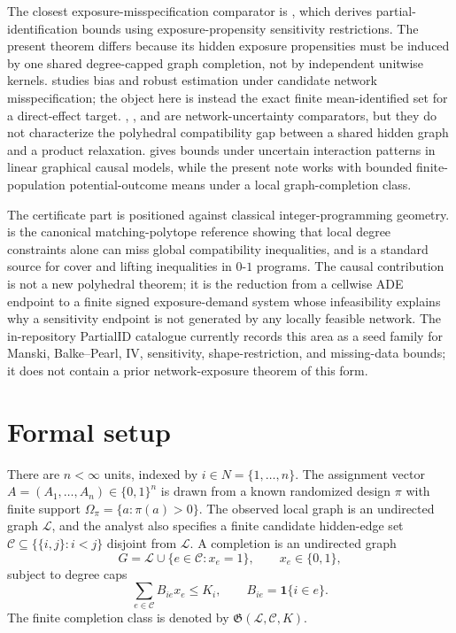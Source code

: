 \documentclass[11pt]{article}
\newcommand{\one}{\mathbf{1}}
\theoremstyle{definition}
\theoremstyle{plain}
\theoremstyle{remark}
\begin{document}
The closest exposure-misspecification comparator is
\cite{SchroderOprescuFeuerriegelKallus2026}, which derives partial-identification
bounds using exposure-propensity sensitivity restrictions.  The present theorem
differs because its hidden exposure propensities must be induced by one shared
degree-capped graph completion, not by independent unitwise kernels.
\cite{WeinsteinNevo2026} studies bias and robust estimation under candidate
network misspecification; the object here is instead the exact finite
mean-identified set for a direct-effect target.  \cite{Egami2020},
\cite{BhattacharyaMalinskyShpitser2020}, and \cite{LiSussmanKolaczyk2021} are
network-uncertainty comparators, but they do not characterize the polyhedral
compatibility gap between a shared hidden graph and a product relaxation.
\cite{ZhangMohanPearl2023} gives bounds under uncertain interaction patterns in
linear graphical causal models, while the present note works with bounded
finite-population potential-outcome means under a local graph-completion class.

The certificate part is positioned against classical integer-programming
geometry.  \cite{Edmonds1965} is the canonical matching-polytope reference
showing that local degree constraints alone can miss global compatibility
inequalities, and \cite{Wolsey1975} is a standard source for cover and lifting
inequalities in \(0\)-\(1\) programs.  The causal contribution is not a new
polyhedral theorem; it is the reduction from a cellwise ADE endpoint to a
finite signed exposure-demand system whose infeasibility explains why a
sensitivity endpoint is not generated by any locally feasible network.  The
in-repository PartialID catalogue currently records this area as a seed family
for Manski, Balke--Pearl, IV, sensitivity, shape-restriction, and missing-data
bounds; it does not contain a prior network-exposure theorem of this form.

\section{Formal setup}
There are \(n<\infty\) units, indexed by \(i\in N=\{1,\ldots,n\}\).  The
assignment vector \(A=(A_1,\ldots,A_n)\in\{0,1\}^n\) is drawn from a known
randomized design \(\pi\) with finite support
\(\Omega_\pi=\{a:\pi(a)>0\}\).  The observed local graph is an undirected graph
\(\mathcal L\), and the analyst also specifies a finite candidate hidden-edge
set \(\mathcal C\subseteq\{\{i,j\}:i<j\}\) disjoint from \(\mathcal L\).  A
completion is an undirected graph
\[
G=\mathcal L\cup\{e\in\mathcal C:x_e=1\},
\qquad x_e\in\{0,1\},
\]
subject to degree caps
\[
\sum_{e\in\mathcal C}B_{ie}x_e\le K_i,\qquad
B_{ie}=\one\{i\in e\}.
\]
The finite completion class is denoted by \(\mathfrak G(\mathcal L,\mathcal C,K)\).
\end{document}
